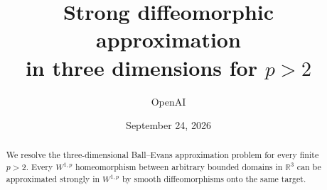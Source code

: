 \documentclass[11pt]{article}
\title{Strong diffeomorphic approximation\\in three dimensions for $p>2$}
\author{OpenAI}
\date{September 24, 2026}
\numberwithin{equation}{section}
\theoremstyle{definition}
\theoremstyle{remark}
\newcommand{\R}{\mathbb R}
\begin{document}
\maketitle
\begin{abstract}
We resolve the three-dimensional Ball--Evans approximation problem for every
finite $p>2$. Every $W^{1,p}$ homeomorphism between arbitrary bounded domains
in $\R^3$ can be approximated strongly in $W^{1,p}$ by smooth diffeomorphisms
onto the same target.
\end{abstract}

\tableofcontents





\appendix

\begingroup
\raggedright


\endgroup
\end{document}
